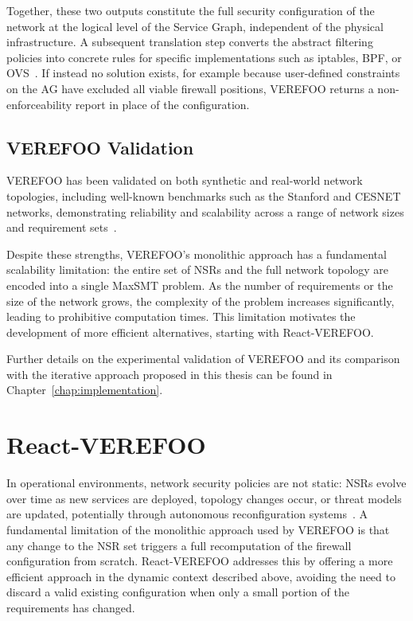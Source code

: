 Together, these two outputs constitute the full security configuration of the network at the logical level of the Service Graph, independent of the physical infrastructure. A subsequent translation step converts the abstract filtering policies into concrete rules for specific implementations such as iptables, BPF, or OVS~\cite{verefoo}. If instead no solution exists, for example because user-defined constraints on the AG have excluded all viable firewall positions, VEREFOO returns a non-enforceability report in place of the configuration.

\subsection{VEREFOO Validation}
VEREFOO has been validated on both synthetic and real-world network topologies, including well-known benchmarks such as the Stanford and CESNET networks, demonstrating reliability and scalability across a range of network sizes and requirement sets~\cite{verefoo}.

Despite these strengths, VEREFOO's monolithic approach has a fundamental scalability limitation: the entire set of NSRs and the full network topology are encoded into a single MaxSMT problem. As the number of requirements or the size of the network grows, the complexity of the problem increases significantly, leading to prohibitive computation times. This limitation motivates the development of more efficient alternatives, starting with React-VEREFOO.

Further details on the experimental validation of VEREFOO and its comparison with the iterative approach proposed in this thesis can be found in Chapter~\ref{chap:implementation}.

\section{React-VEREFOO}

In operational environments, network security policies are not static: NSRs evolve over time as new services are deployed, topology changes occur, or threat models are updated, potentially through autonomous reconfiguration systems~\cite{autonomous}. A fundamental limitation of the monolithic approach used by VEREFOO is that any change to the NSR set triggers a full recomputation of the firewall configuration from scratch. React-VEREFOO addresses this by offering a more efficient approach in the dynamic context described above, avoiding the need to discard a valid existing configuration when only a small portion of the requirements has changed. 


